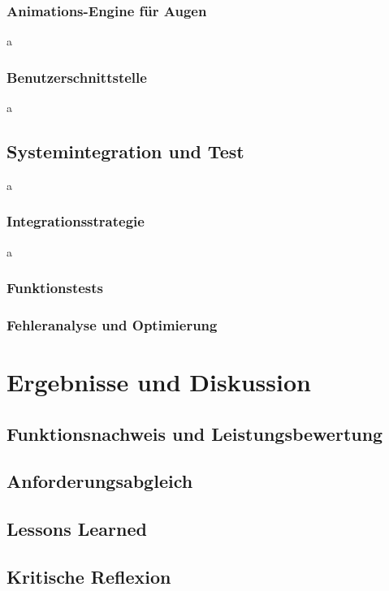 \subsection{Animations-Engine für Augen}
a
\subsection{Benutzerschnittstelle}
a
\section{Systemintegration und Test}
a
\subsection{Integrationsstrategie}
a
\subsection{Funktionstests}
\subsection{Fehleranalyse und Optimierung}

\chapter{Ergebnisse und Diskussion}
\section{Funktionsnachweis und Leistungsbewertung}
\section{Anforderungsabgleich}
\section{Lessons Learned}
\section{Kritische Reflexion}



%
%
